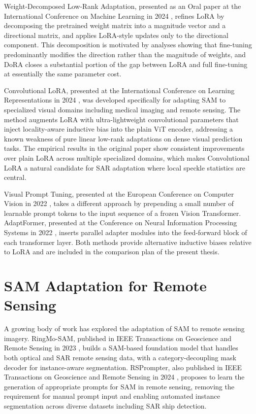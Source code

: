 \documentclass[11pt,a4paper,oneside]{report}
\begin{document}
Weight-Decomposed Low-Rank Adaptation, presented as an Oral paper at the International Conference on Machine Learning in 2024 \cite{Liu2024DoRA}, refines LoRA by decomposing the pretrained weight matrix into a magnitude vector and a directional matrix, and applies LoRA-style updates only to the directional component. This decomposition is motivated by analyses showing that fine-tuning predominantly modifies the direction rather than the magnitude of weights, and DoRA closes a substantial portion of the gap between LoRA and full fine-tuning at essentially the same parameter cost.

Convolutional LoRA, presented at the International Conference on Learning Representations in 2024 \cite{Zhong2024ConvLoRA}, was developed specifically for adapting SAM to specialized visual domains including medical imaging and remote sensing. The method augments LoRA with ultra-lightweight convolutional parameters that inject locality-aware inductive bias into the plain ViT encoder, addressing a known weakness of pure linear low-rank adaptations on dense visual prediction tasks. The empirical results in the original paper show consistent improvements over plain LoRA across multiple specialized domains, which makes Convolutional LoRA a natural candidate for SAR adaptation where local speckle statistics are central.

Visual Prompt Tuning, presented at the European Conference on Computer Vision in 2022 \cite{Jia2022VPT}, takes a different approach by prepending a small number of learnable prompt tokens to the input sequence of a frozen Vision Transformer. AdaptFormer, presented at the Conference on Neural Information Processing Systems in 2022 \cite{Chen2022AdaptFormer}, inserts parallel adapter modules into the feed-forward block of each transformer layer. Both methods provide alternative inductive biases relative to LoRA and are included in the comparison plan of the present thesis.

\section{SAM Adaptation for Remote Sensing}

A growing body of work has explored the adaptation of SAM to remote sensing imagery. RingMo-SAM, published in IEEE Transactions on Geoscience and Remote Sensing in 2023 \cite{Yan2023RingMoSAM}, builds a SAM-based foundation model that handles both optical and SAR remote sensing data, with a category-decoupling mask decoder for instance-aware segmentation. RSPrompter, also published in IEEE Transactions on Geoscience and Remote Sensing in 2024 \cite{Chen2024RSPrompter}, proposes to learn the generation of appropriate prompts for SAM in remote sensing, removing the requirement for manual prompt input and enabling automated instance segmentation across diverse datasets including SAR ship detection.
\end{document}
